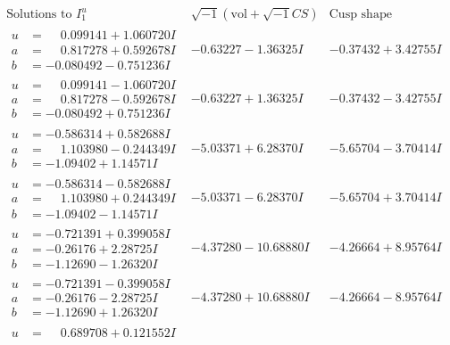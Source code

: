 \documentclass[1p]{elsarticle_modified}
\theoremstyle{definition}
\newcommand{\I}{\sqrt{-1}}
\begin{document}
$$\begin{array}{c|c|c}  
\text{Solutions to }I^u_{1}& \I (\text{vol} + \sqrt{-1}CS) & \text{Cusp shape}\\
 \hline 
\begin{aligned}
u &= \phantom{-}0.099141 + 1.060720 I \\
a &= \phantom{-}0.817278 + 0.592678 I \\
b &= -0.080492 - 0.751236 I\end{aligned}
 & -0.63227 - 1.36325 I & -0.37432 + 3.42755 I \\ \hline\begin{aligned}
u &= \phantom{-}0.099141 - 1.060720 I \\
a &= \phantom{-}0.817278 - 0.592678 I \\
b &= -0.080492 + 0.751236 I\end{aligned}
 & -0.63227 + 1.36325 I & -0.37432 - 3.42755 I \\ \hline\begin{aligned}
u &= -0.586314 + 0.582688 I \\
a &= \phantom{-}1.103980 - 0.244349 I \\
b &= -1.09402 + 1.14571 I\end{aligned}
 & -5.03371 + 6.28370 I & -5.65704 - 3.70414 I \\ \hline\begin{aligned}
u &= -0.586314 - 0.582688 I \\
a &= \phantom{-}1.103980 + 0.244349 I \\
b &= -1.09402 - 1.14571 I\end{aligned}
 & -5.03371 - 6.28370 I & -5.65704 + 3.70414 I \\ \hline\begin{aligned}
u &= -0.721391 + 0.399058 I \\
a &= -0.26176 + 2.28725 I \\
b &= -1.12690 - 1.26320 I\end{aligned}
 & -4.37280 - 10.68880 I & -4.26664 + 8.95764 I \\ \hline\begin{aligned}
u &= -0.721391 - 0.399058 I \\
a &= -0.26176 - 2.28725 I \\
b &= -1.12690 + 1.26320 I\end{aligned}
 & -4.37280 + 10.68880 I & -4.26664 - 8.95764 I \\ \hline\begin{aligned}
u &= \phantom{-}0.689708 + 0.121552 I \\

\end{aligned}
\end{array}$$
\end{document}

